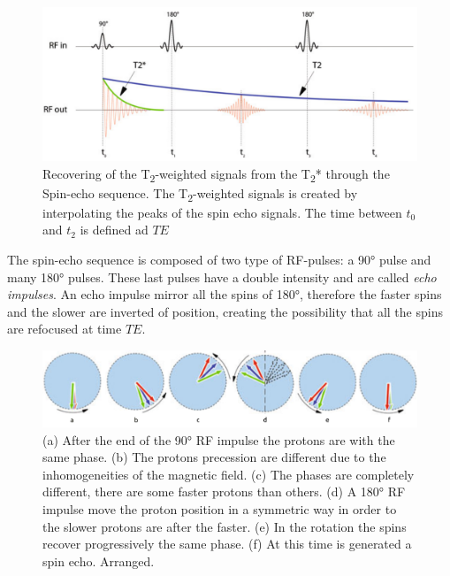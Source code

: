  \begin{figure}[h]
    \centering
    \includegraphics[width=1\textwidth]{images/t2vst2star.png}
    \caption{Recovering of the T\textsubscript{2}-weighted signals from the T\textsubscript{2}* through the Spin-echo sequence. The T\textsubscript{2}-weighted signals is created by interpolating the peaks of the spin echo signals. The time between $t_0$ and $t_2$ is defined ad $TE$ \cite{elementiRisonanza}}
    \label{fig:T2vsT2*}
 \end{figure}

 \noindent The spin-echo sequence is composed of two type of RF-pulses: a 90° pulse and many 180° pulses. These last pulses have a double intensity and are called \emph{echo impulses}. An echo impulse mirror all the spins of 180°, therefore the faster spins and the slower are inverted of position, creating the possibility that all the spins are refocused at time $TE$. \cite{slides}

 \begin{figure}[h]
   \centering
   \includegraphics[width=1\textwidth]{images/t2_relax.png}
   \caption{(a) After the end of the 90° RF impulse the protons are with the same phase. (b) The protons precession are different due to the inhomogeneities of the magnetic field. (c) The phases are completely different, there are some faster protons than others. (d) A 180° RF impulse move the proton position in a symmetric way in order to the slower protons are after the faster. (e) In the rotation the spins recover progressively the same phase. (f) At this time is generated a spin echo. \cite{elementiRisonanza} Arranged.}
   \label{fig:T2_relax}
 \end{figure}

